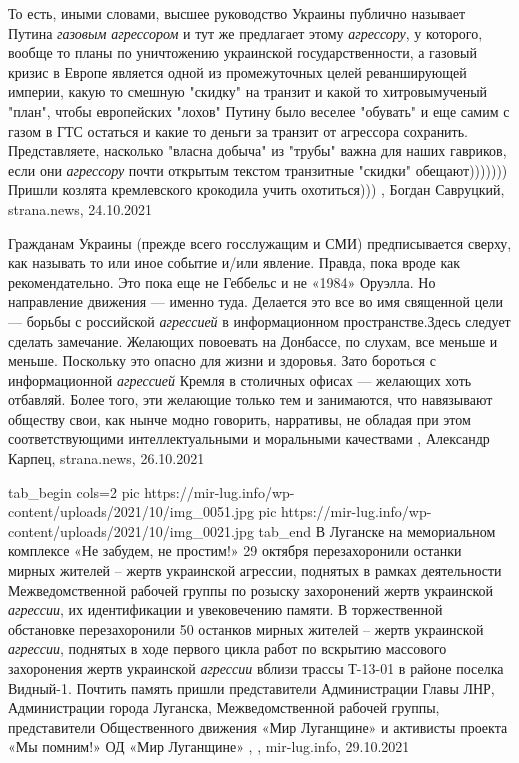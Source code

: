 То есть, иными словами, высшее руководство Украины публично называет Путина
\emph{газовым агрессором} и тут же предлагает этому \emph{агрессору}, у которого, вообще то
планы по уничтожению украинской государственности, а газовый кризис в Европе
является одной из промежуточных целей реванширующей империи, какую то смешную
"скидку" на транзит и какой то хитровымученый "план", чтобы европейских "лохов"
Путину было веселее "обувать" и еще самим с газом в ГТС остаться и какие то
деньги за транзит от агрессора сохранить.  Представляете, насколько "власна
добыча" из "трубы" важна для наших гавриков, если они \emph{агрессору} почти открытым
текстом транзитные "скидки" обещают))))))) Пришли козлята кремлевского
крокодила учить охотиться)))
, 
Богдан Савруцкий, strana.news, 24.10.2021

Гражданам Украины (прежде всего госслужащим и СМИ) предписывается сверху, как
называть то или иное событие и/или явление. Правда, пока вроде как
рекомендательно. Это пока еще не Геббельс и не «1984» Оруэлла. Но направление
движения — именно туда.  Делается это все во имя священной цели — борьбы с
российской \emph{агрессией} в информационном пространстве.Здесь следует сделать
замечание. Желающих повоевать на Донбассе, по слухам, все меньше и меньше.
Поскольку это опасно для жизни и здоровья. Зато бороться с информационной
\emph{агрессией} Кремля в столичных офисах — желающих хоть отбавляй. Более
того, эти желающие только тем и занимаются, что навязывают обществу свои, как
нынче модно говорить, нарративы, не обладая при этом соответствующими
интеллектуальными и моральными качествами
, 
Александр Карпец, strana.news, 26.10.2021

\ifcmt
  tab_begin cols=2
     pic https://mir-lug.info/wp-content/uploads/2021/10/img_0051.jpg
     pic https://mir-lug.info/wp-content/uploads/2021/10/img_0021.jpg
  tab_end
\fi
В Луганске на мемориальном комплексе «Не забудем, не простим!» 29 октября
перезахоронили останки мирных жителей – жертв украинской агрессии, поднятых в
рамках деятельности Межведомственной рабочей группы по розыску захоронений
жертв украинской \emph{агрессии}, их идентификации и увековечению памяти.  В
торжественной обстановке перезахоронили 50 останков мирных жителей – жертв
украинской \emph{агрессии}, поднятых в ходе первого цикла работ по вскрытию массового
захоронения жертв украинской \emph{агрессии} вблизи трассы Т-13-01 в районе поселка
Видный-1. Почтить память пришли представители Администрации Главы ЛНР,
Администрации города Луганска, Межведомственной рабочей группы, представители
Общественного движения «Мир Луганщине» и активисты проекта «Мы помним!» ОД «Мир
Луганщине»
, 
, mir-lug.info, 29.10.2021
